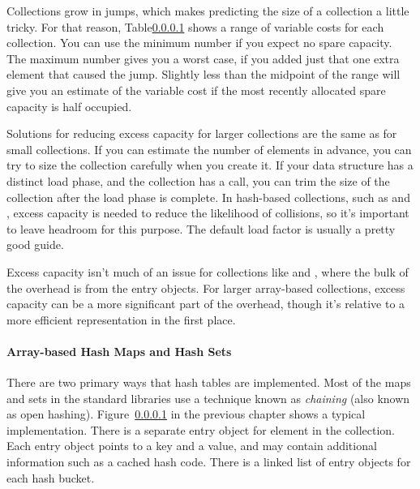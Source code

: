 Collections grow in jumps, which makes predicting the size of a collection a
little tricky.  For that reason, Table\ref{} shows
a range of variable costs for each collection.  You can use the minimum
number if you expect no spare capacity. The maximum number gives you a worst
case, if you added just that one extra element that caused the jump.
Slightly less than the midpoint of the range will give you an estimate of the
variable cost if the most recently allocated spare capacity is half occupied.

Solutions for reducing excess capacity for larger collections are the same as
for small collections. If you can estimate the number of elements in advance,
you can try to size the collection carefully when you create it.  If your data structure has a
distinct load phase, and the collection has a  call, you can
trim the size of the collection after the load phase is complete. In hash-based collections, such as
 and , excess capacity is needed to reduce the
likelihood of collisions, so it's important to leave headroom for this
purpose. The default load factor is usually a pretty good guide. 

Excess capacity isn't much of an issue for collections like
 and , where the bulk of the overhead is from the entry objects.
For larger array-based collections, excess capacity can be a more significant
part of the overhead, though it's relative to a more efficient representation in the
first place. 


\paragraph{Array-based Hash Maps and Hash Sets}

There are two primary ways that hash tables are implemented. Most of the maps and sets
in the standard libraries use a technique known as \emph{chaining} (also
known as open hashing). Figure~\ref{} in the previous chapter shows a typical
implementation. There is a separate entry object for element in the collection.
Each entry object points to a key and a value, and may contain
additional information such as a cached hash code. There is a linked list of
entry objects for each hash bucket.

